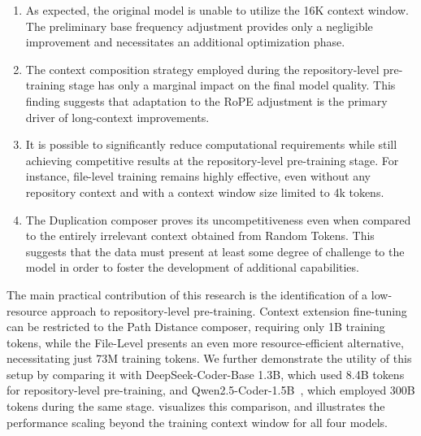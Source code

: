 \begin{enumerate}
\item As expected, the original model is unable to utilize the 16K context window. The preliminary base frequency adjustment provides only a negligible improvement and necessitates an additional optimization phase.
\item The context composition strategy employed during the repository-level pre-training stage has only a marginal impact on the final model quality. This finding suggests that adaptation to the RoPE adjustment is the primary driver of long-context improvements.
\item It is possible to significantly reduce computational requirements while still achieving competitive results at the repository-level pre-training stage. For instance, file-level training remains highly effective, even without any repository context and with a context window size limited to 4k tokens.
\item The Duplication composer proves its uncompetitiveness even when compared to the entirely irrelevant context obtained from Random Tokens. This suggests that the data must present at least some degree of challenge to the model in order to foster the development of additional capabilities.
\end{enumerate}

The main practical contribution of this research is the identification of a low-resource approach to repository-level pre-training. Context extension fine-tuning can be restricted to the Path Distance composer, requiring only 1B training tokens, while the File-Level presents an even more resource-efficient alternative, necessitating just 73M training tokens. We further demonstrate the utility of this setup by comparing it with DeepSeek-Coder-Base 1.3B, which used 8.4B tokens for repository-level pre-training, and Qwen2.5-Coder-1.5B~\parencite{hui2024}, which employed 300B tokens during the same stage.  visualizes this comparison, and  illustrates the performance scaling beyond the training context window for all four models.

